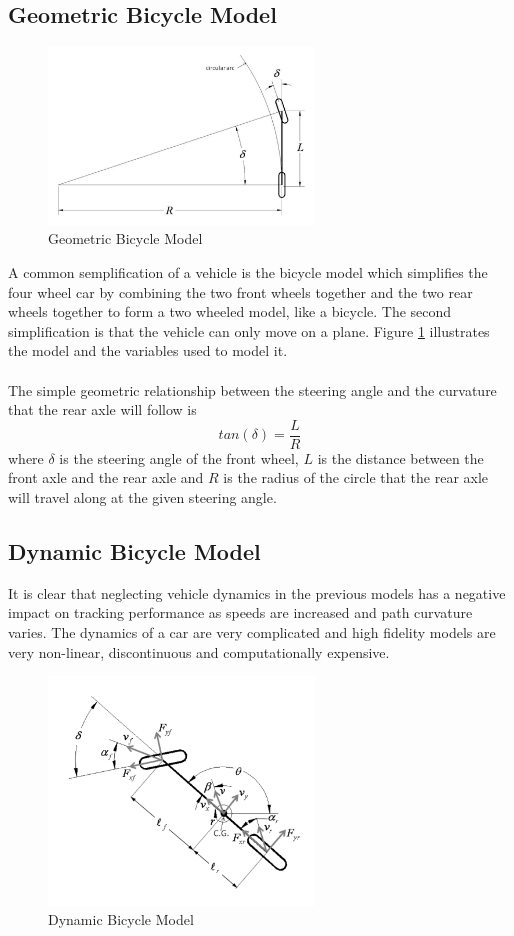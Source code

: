 \documentclass{article}
\begin{document}
\subsection{Geometric Bicycle Model}
\begin{figure}[H]
	\centering
    \includegraphics[width=200pt]{bicycle.png}
    \caption{Geometric Bicycle Model}
    \label{bicycle}
\end{figure}
A common semplification of a vehicle is the bicycle model which simplifies the four wheel car by combining the two front wheels together and the two rear wheels together to form a two wheeled model, like a bicycle. The second simplification is that the vehicle can only move on a plane. Figure \ref{bicycle} illustrates the model and the variables used to model it. \\ \\ The simple geometric relationship between the steering angle and the curvature that the rear axle will follow is 
\begin{equation}
	tan(\delta) = \frac{L}{R}
\end{equation}
where $\delta$ is the steering angle of the front wheel, $L$ is the distance between the front axle and the rear axle and $R$ is the radius of the circle that the rear axle will travel along at the given steering angle.

\subsection{Dynamic Bicycle Model}
It is clear that neglecting vehicle dynamics in the previous models has a negative impact on tracking performance as speeds are increased and path curvature varies. The dynamics of a car are very complicated and high fidelity models are very non-linear, discontinuous and computationally expensive.

\begin{figure}[H]
	\centering
    \includegraphics[width=200pt]{dynamic_bicycle}
    \caption{Dynamic Bicycle Model}
    \label{dynamic}
\end{figure}
\end{document}
